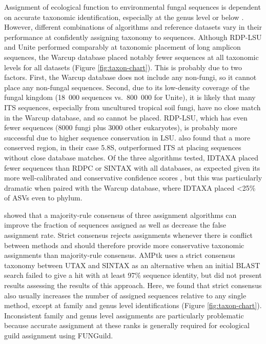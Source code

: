 \documentclass[
  12pt,
]{article}
\begin{document}
Assignment of ecological function to environmental fungal sequences is dependent on accurate taxonomic identification, especially at the genus level or below \autocite{nguyen2016funguild}.
However, different combinations of algorithms and reference datasets vary in their performance at confidently assigning taxonomy to sequences.
Although RDP-LSU and Unite performed comparably at taxonomic placement of long amplicon sequences, the Warcup database placed notably fewer sequences at all taxonomic levels for all datasets (Figure \ref{fig:taxon-chart}).
This is probably due to two factors.
First, the Warcup database does not include any non-fungi, so it cannot place any non-fungal sequences.
Second, due to its low-density coverage of the fungal kingdom (18~000 sequences vs.~800~000 for Unite), it is likely that many ITS sequences, especially from uncultured tropical soil fungi, have no close match in the Warcup database, and so cannot be placed.
RDP-LSU, which has even fewer sequences (8000 fungi plus 3000 other eukaryotes), is probably more successful due to higher sequence conservation in LSU.
\textcite{heeger2019} also found that a more conserved region, in their case 5.8S, outperformed ITS at placing sequences without close database matches.
Of the three algorithms tested, IDTAXA placed fewer sequences than RDPC or SINTAX with all databases, as expected given its more well-calibrated and conservative confidence scores \autocite{murali2018a}, but this was particularly dramatic when paired with the Warcup database, where IDTAXA placed \textless25\% of ASVs even to phylum.

\textcite{gdanetz2017} showed that a majority-rule consensus of three assignment algorithms can improve the fraction of sequences assigned as well as decrease the false assignment rate.
Strict consensus rejects assignments whenever there is conflict between methods and should therefore provide more conservative taxonomic assignments than majority-rule consensus.
AMPtk \autocite{palmer2018} uses a strict consensus taxonomy between UTAX and SINTAX as an alternative when an initial BLAST search failed to give a hit with at least 97\% sequence identity, but did not present results assessing the results of this approach.
Here, we found that strict consensus also usually increases the number of assigned sequences relative to any single method, except at family and genus level identifications (Figure \ref{fig:taxon-chart}).
Inconsistent family and genus level assignments are particularly problematic because accurate assignment at these ranks is generally required for ecological guild assignment using FUNGuild.
\end{document}
